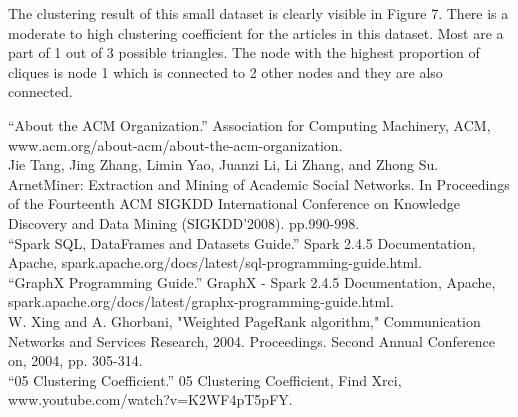\documentclass[journal]{IEEEtran}
\begin{document}
The clustering result of this small dataset is clearly visible in Figure 7. There is a moderate to high clustering coefficient for the articles in this dataset. Most are a part of 1 out of 3 possible triangles. The node with the highest proportion of cliques is node 1 which is connected to 2 other nodes and they are also connected.
\begin{thebibliography}{6}
 “About the ACM Organization.” Association for Computing Machinery, ACM, www.acm.org/about-acm/about-the-acm-organization.\\

 Jie Tang, Jing Zhang, Limin Yao, Juanzi Li, Li Zhang, and Zhong Su. ArnetMiner: Extraction and Mining of Academic Social Networks. In Proceedings of the Fourteenth ACM SIGKDD International Conference on Knowledge Discovery and Data Mining (SIGKDD'2008). pp.990-998.\\

 “Spark SQL, DataFrames and Datasets Guide.” Spark 2.4.5 Documentation, Apache, spark.apache.org/docs/latest/sql-programming-guide.html.\\

 “GraphX Programming Guide.” GraphX - Spark 2.4.5 Documentation, Apache, spark.apache.org/docs/latest/graphx-programming-guide.html.\\

 W. Xing and A. Ghorbani, "Weighted PageRank algorithm," Communication Networks and Services Research, 2004. Proceedings. Second Annual Conference on, 2004, pp. 305-314.\\

 “05 Clustering Coefficient.” 05 Clustering Coefficient, Find Xrci, www.youtube.com/watch?v=K2WF4pT5pFY.\\
\end{thebibliography}
\end{document}
